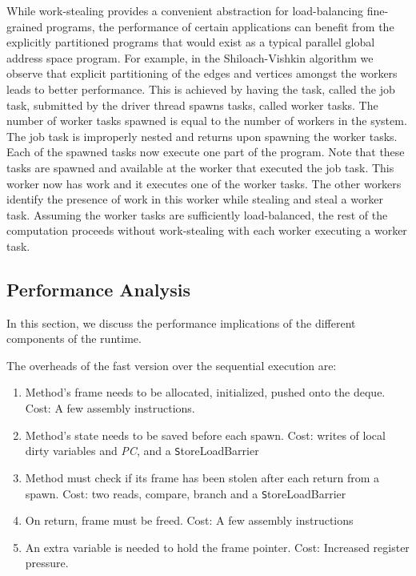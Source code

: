 While work-stealing provides a convenient abstraction for
load-balancing fine-grained programs, the performance of certain
applications can benefit from the explicitly partitioned programs that
would exist as a typical parallel global address space program. For
example, in the Shiloach-Vishkin algorithm we observe that explicit
partitioning of the edges and vertices amongst the workers leads to
better performance. This is achieved by having the task, called the
job task, submitted by the driver thread spawns tasks, called worker
tasks. The number of worker tasks spawned is equal to the number of
workers in the system. The job task is improperly nested and returns
upon spawning the worker tasks. Each of the spawned tasks now execute
one part of the program. Note that these tasks are spawned and
available at the worker that executed the job task. This worker now
has work and it executes one of the worker tasks. The other workers
identify the presence of work in this worker while stealing and steal
a worker task. Assuming the worker tasks are sufficiently
load-balanced, the rest of the computation proceeds without
work-stealing with each worker executing a worker task. 



\subsection{Performance Analysis}

In this section, we discuss the performance implications of the
different components of the runtime. 

The overheads of the fast version over the sequential execution are:

\begin{enumerate}
\item Method's frame needs to be allocated, initialized, pushed onto
  the deque. Cost: A few assembly instructions.
\item Method's state needs to be saved before each spawn. Cost: writes
  of local dirty variables and {\em PC}, and a {\texttt
  StoreLoadBarrier}
\item Method must check if its frame has been stolen after each
  return from a spawn. Cost: two reads, compare, branch and a 
  {\texttt StoreLoadBarrier} 
\item On return, frame must be freed. Cost: A few assembly instructions
\item An extra variable is needed to hold the frame pointer. Cost: Increased
  register pressure.
\end{enumerate}


